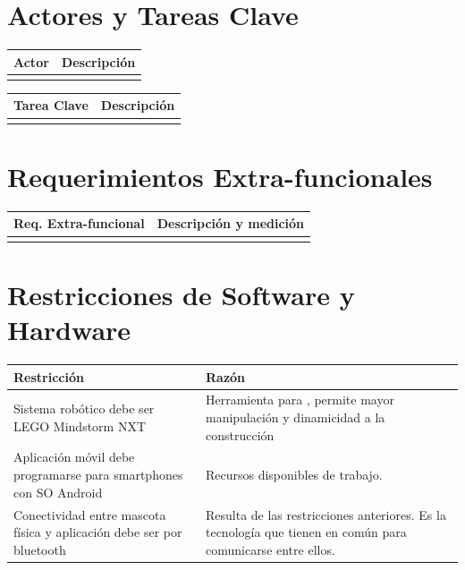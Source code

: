 \documentclass[letterpaper,12pt]{article} %
\numberwithin{equation}{section} %
\numberwithin{figure}{section} %
\numberwithin{table}{section} %
\begin{document}
\newpage
\section{Actores y Tareas Clave}

\begin{table}[hb!]
  \begin{tabular}{lp{7cm}}\hline
    Actor & Descripci\'on \\ \hline \hline %
    & \\ \hline    
  \end{tabular}
\end{table}

\begin{table}[hb!]
  \begin{tabular}{lp{7cm}}\hline
    Tarea Clave & Descripci\'on \\ \hline\hline %
    & \\ \hline
  \end{tabular}
\end{table}

\newpage
\section{Requerimientos Extra-funcionales}

\begin{table}[hb!]
  \begin{tabular}{lp{7cm}}\hline 
    Req. Extra-funcional & Descripci\'on y medici\'on \\ \hline\hline %
    & \\ \hline
  \end{tabular}
\end{table}

\newpage
\section{Restricciones de Software y Hardware}

\begin{table}[hb!]
  \begin{tabular}{lp{7cm}}\hline
    Restricci\'on & Raz\'on \\ \hline\hline %
    Sistema rob\'otico debe ser LEGO Mindstorm NXT & Herramienta para , permite mayor manipulaci\'on y dinamicidad a la construcci\'on\\ \hline
    Aplicaci\'on m\'ovil debe programarse para smartphones con SO Android & Recursos disponibles de trabajo. \\ \hline
    Conectividad entre mascota f\'isica y aplicaci\'on debe ser por bluetooth & Resulta de las restricciones anteriores. Es la tecnología que tienen en común para comunicarse entre ellos.\\ \hline \hline
  \end{tabular}
\end{table}
\end{document}
